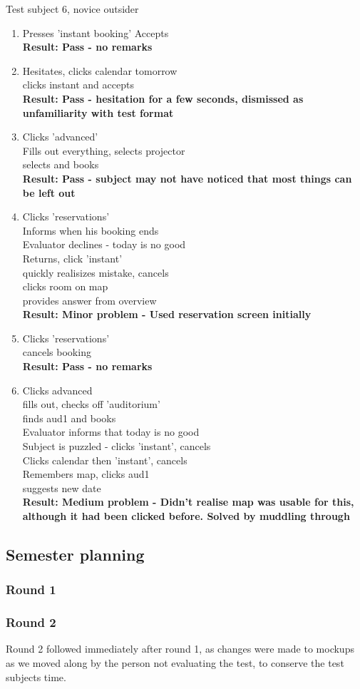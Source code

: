 Test subject 6, novice outsider
\begin{enumerate}
\item Presses 'instant booking'
Accepts \\
\textbf{Result: Pass - no remarks}
\item Hesitates, clicks calendar tomorrow \\
clicks instant and accepts \\
\textbf{Result: Pass - hesitation for a few seconds, dismissed as unfamiliarity with test format}
\item Clicks 'advanced' \\
Fills out everything, selects projector \\
selects and books \\
\textbf{Result: Pass - subject may not have noticed that most things can be left out}
\item Clicks 'reservations' \\
Informs when his booking ends \\
Evaluator declines - today is no good \\
Returns, click 'instant' \\
quickly realisizes mistake, cancels \\
clicks room on map \\
provides answer from overview \\
\textbf{Result: Minor problem - Used reservation screen initially}
\item Clicks 'reservations' \\
cancels booking \\
\textbf{Result: Pass - no remarks}
\item Clicks advanced \\
fills out, checks off 'auditorium' \\
finds aud1 and books \\
Evaluator informs that today is no good \\
Subject is puzzled - clicks 'instant', cancels \\
Clicks calendar then 'instant', cancels \\
Remembers map, clicks aud1 \\
suggests new date \\
\textbf{Result: Medium problem - Didn't realise map was usable for this, although it had been clicked before. Solved by muddling through}
\end{enumerate}

\subsection{Semester planning}

\subsubsection{Round 1}
\begingroup
\obeylines

\endgroup
\subsubsection{Round 2}
Round 2 followed immediately after round 1, as changes were made to mockups as we moved along by the person not evaluating the test, to conserve the test subjects time.
